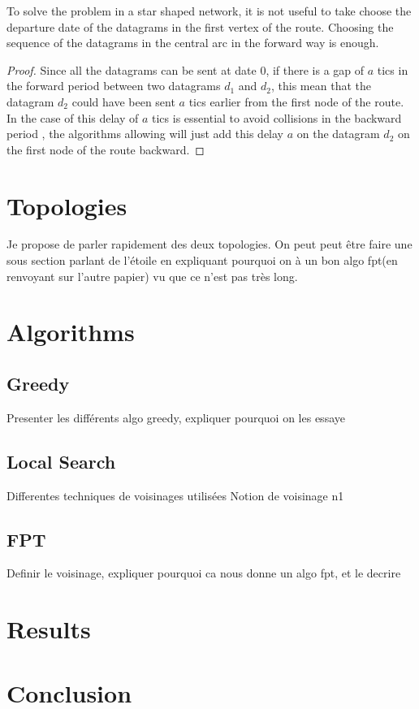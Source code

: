 \documentclass[french]{article}
\begin{document}
     
    \begin{lemma}
   
    To solve the problem \spall in a star shaped network, it is not useful to take choose the departure date of the datagrams in the first vertex of the route. Choosing the sequence of the datagrams in the central arc in the forward way is enough.
     \label{lemma:spallorder}
     \end{lemma}
   \begin{proof}
    Since all the datagrams can be sent at date $0$, if there is a gap of $a$ tics in the forward period between two datagrams $d_1$ and $d_2$, this mean that the datagram $d_2$ could have been sent $a$ tics earlier from the first node of the route. In the case of this delay of $a$ tics is essential to avoid collisions in the backward period , the algorithms allowing will just add this delay $a$ on the datagram $d_2$ on the first node of the route backward.
   \end{proof}
\section{Topologies}
Je propose de parler rapidement des deux topologies. On peut peut être faire une sous section parlant de l'étoile en expliquant pourquoi on à un bon algo fpt(en renvoyant sur l'autre papier) vu que ce n'est pas très long.
\section{Algorithms}
\subsection{Greedy}
Presenter les différents algo greedy, expliquer pourquoi on les essaye
\subsection{Local Search}
Differentes techniques de voisinages utilisées Notion de voisinage n1
\subsection{FPT}
Definir le voisinage, expliquer pourquoi ca nous donne un algo fpt, et le decrire 
\section{Results}
\section{Conclusion}
\end{document}
